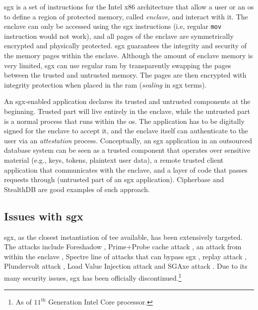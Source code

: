 			\acrfull{sgx} is a set of instructions for the Intel x86 architecture that allow a user or an \acrlong{os} to define a region of protected memory, called \emph{enclave}, and interact with it.
			The enclave can only be accessed using the \acrshort{sgx} instructions (i.e, regular \texttt{mov} instruction would not work), and all pages of the enclave are symmetrically encrypted and physically protected.
			\acrshort{sgx} guarantees the integrity and security of the memory pages within the enclave.
			Although the amount of enclave memory is very limited, \acrshort{sgx} can use regular \acrshort{ram} by transparently swapping the pages between the trusted and untrusted memory.
			The pages are then encrypted with integrity protection when placed in the \acrshort{ram} (\emph{sealing} in \acrshort{sgx} terms).

			An \acrshort{sgx}-enabled application declares its trusted and untrusted components at the beginning.
			Trusted part will live entirely in the enclave, while the untrusted part is a normal process that runs within the \acrshort{os}.
			The application has to be digitally signed for the enclave to accept it, and the enclave itself can authenticate to the user via an \emph{attestation} process.
			Conceptually, an \acrshort{sgx} application in an outsourced database system can be seen as a trusted component that operates over sensitive material (e.g., keys, tokens, plaintext user data), a remote trusted client application that communicates with the enclave, and a layer of code that passes requests through (untrusted part of an \acrshort{sgx} application).
			Cipherbase \cite{cipherbase-daas} and StealthDB \cite{stealth-db} are good examples of such approach.

		\subsection{Issues with \acrshort{sgx}}

			\acrshort{sgx}, as the closest instantiation of \acrshort{tee} available, has been extensively targeted.
			The attacks include Foreshadow \cite{foreshadow}, Prime+Probe cache attack \cite{prime-probe-sgx-attack}, an attack from within the enclave \cite{enclave-sgx-attack}, Spectre line of attacks that can bypass \acrshort{sgx} \cite{spectre-sgx-attack}, replay attack \cite{replay-sgx-attack}, Plundervolt attack \cite{plundervolt-sgx-attack}, Load Value Injection attack \cite{lvi-sgx-attack} and SGAxe attack \cite{sgaxe-sgx-attack}.
			Due to its many security issues, \acrshort{sgx} has been officially discontinued.\footnote{As of $11^\text{th}$ Generation Intel Core processor.}

